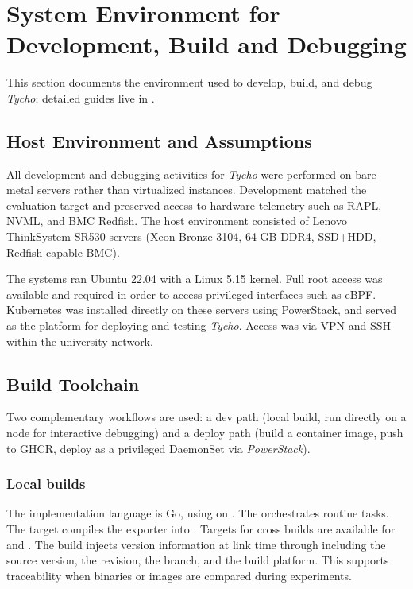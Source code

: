 \section{System Environment for Development, Build and Debugging}
\label{sec:tycho_sysenv}
This section documents the environment used to develop, build, and debug \textit{Tycho}; detailed guides live in \cite{TychoRepo}.

\subsection{Host Environment and Assumptions}
\label{sec:tycho_sysenv_host}

All development and debugging activities for \textit{Tycho} were performed on bare-metal servers rather than virtualized instances. Development matched the evaluation target and preserved access to hardware telemetry such as RAPL, NVML, and BMC Redfish. The host environment consisted of Lenovo ThinkSystem SR530 servers (Xeon Bronze 3104, 64 GB DDR4, SSD+HDD, Redfish-capable BMC).

The systems ran Ubuntu 22.04 with a Linux 5.15 kernel. Full root access was available and required in order to access privileged interfaces such as eBPF. Kubernetes was installed directly on these servers using PowerStack\cite{PowerStack}, and served as the platform for deploying and testing \textit{Tycho}. Access was via VPN and SSH within the university network.

\subsection{Build Toolchain}
\label{sec:tycho_sysenv_build}

Two complementary workflows are used: a dev path (local build, run directly on a node for interactive debugging) and a deploy path (build a container image, push to GHCR, deploy as a privileged DaemonSet via \textit{PowerStack}).

\subsubsection{Local builds}
\label{subsec:tycho_sysenv_build_local}
The implementation language is Go, using  on . The  orchestrates routine tasks. The target  compiles the exporter into . Targets for cross builds are available for  and . The build injects version information at link time through  including the source version, the revision, the branch, and the build platform. This supports traceability when binaries or images are compared during experiments.

